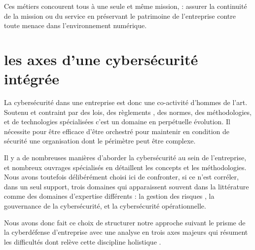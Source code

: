 Ces métiers concourent tous à une seule et même mission, : assurer la continuité de la mission ou du service en préservant le patrimoine de l'entreprise contre toute menace dans l'environnement numérique.





\section{les axes d'une cybersécurité intégrée}


La cybersécurité dans une entreprise est donc une co-activité d'hommes de l'art.  Soutenu et contraint par des lois, des règlements , des normes, des méthodologies, et de technologies spécialisées c'est un domaine en perpétuelle évolution.  Il nécessite pour être efficace d'être orchestré pour maintenir en condition de sécurité une organisation dont le périmètre  peut être complexe.

Il y a de nombreuses manières d’aborder la cybersécurité au sein de l’entreprise, et nombreux ouvrages spécialisés en détaillent les concepts et les méthodologies. Nous avons toutefois délibérément choisi ici de confronter, si ce n'est corréler, dans un seul support, trois domaines qui apparaissent souvent dans la littérature comme des domaines d'expertise différents : la gestion des risques , la gouvernance de la cybersécurité, et la cybersécurité opérationnelle. 

Nous avons donc fait ce choix de structurer notre approche suivant le prisme de la cyberdéfense d'entreprise avec une analyse en trois axes majeurs qui résument les difficultés dont relève cette discipline holistique \cite{sch13}. 



